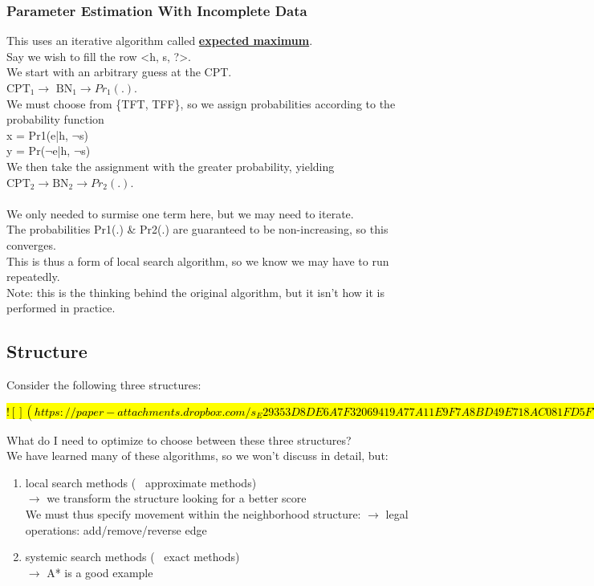 \documentclass[../../lecture_notes.tex]{subfiles}
\begin{document}
\subsubsection*{Parameter Estimation With Incomplete Data}
\noindent This uses an iterative algorithm called \textbf{\underline{expected maximum}}.\\
Say we wish to fill the row <h, s, ?>.\\
We start with an arbitrary guess at the CPT.\\
	\indent $\text{CPT}_1 \rightarrow \text{ BN}_1 \rightarrow Pr_1(.)$.\\
We must choose from \{TFT, TFF\}, so we assign probabilities according to the probability function\\
	\indent x = Pr1(e|h, $\neg$s)\\
	\indent y = Pr($\neg$e|h, $\neg$s)\\
We then take the assignment with the greater probability, yielding\\
	\indent $\text{CPT}_2 \rightarrow \text{BN}_2 \rightarrow Pr_2(.)$.\\
\\
We only needed to surmise one term here, but we may need to iterate.\\
The probabilities Pr1(.) \& Pr2(.) are guaranteed to be non-increasing, so this converges.\\
This is thus a form of local search algorithm, so we know we may have to run repeatedly.\\
Note: this is the thinking behind the original algorithm, but it isn’t how it is performed in practice.\\

\subsection*{Structure}
\noindent Consider the following three structures:

\hl{
$![](https://paper-attachments.dropbox.com/s_E29353D8DE6A7F32069419A77A11E9F7A8BD49E718AC081FD5F77701FB86FF68_1590908603345_Untitled+drawing+4.jpg)$
}

\noindent What do I need to optimize to choose between these three structures?\\
We have learned many of these algorithms, so we won’t discuss in detail, but:
	\begin{enumerate} [itemsep=0mm]
		\item local search methods (~ approximate methods)\\
				$\rightarrow$ we transform the structure looking for a better score\\
			We must thus specify movement within the neighborhood structure:
				$\rightarrow$ legal operations: add/remove/reverse edge
		\item systemic search methods (~ exact methods)\\
			$\rightarrow$ A* is a good example
	\end{enumerate} \medskip
\end{document}
